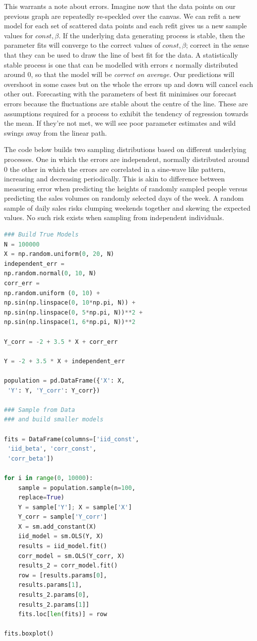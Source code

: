 \documentclass[10pt,a4paper,notitlepage, twocolumn]{article}
\begin{document}
This warrants a note about errors. Imagine now that the data points on our previous graph are repeatedly re-speckled over the canvas. We can refit a new model for each set of scattered data points and each refit gives us a new sample values for $ const, \beta$. If the underlying data generating process is stable, then the parameter fits will converge to the correct values of $const, \beta$; correct in the sense that they can be used to draw the line of best fit for the data. A statistically stable process is one that can be modelled with errors $\epsilon$ normally distributed around 0, so that the model will be \textit{ correct on average.} Our predictions will overshoot in some cases but on the whole the errors up and down will cancel each other out. Forecasting with the parameters of best fit minimises our forecast errors because the fluctuations are stable about the centre of the line. These are assumptions required for a process to exhibit the tendency of regression towards the mean. If they're not met, we will see poor parameter estimates and wild swings away from the linear path.
\newline

\noindent The code below builds two sampling distributions based on different underlying processes.  One in which the errors are independent, normally distributed around 0 the other in which the errors are correlated in a sine-wave like pattern, increasing and decreasing periodically. This is akin to difference between measuring error when predicting the heights of randomly sampled people versus predicting the sales volumes on randomly selected days of the week. A random sample of daily sales  risks clumping weekends together and skewing the expected values. No such risk exists when sampling from independent individuals. 

\begin{lstlisting}[language=Python]
### Build True Models
N = 100000
X = np.random.uniform(0, 20, N)
independent_err = 
np.random.normal(0, 10, N)
corr_err = 
np.random.uniform (0, 10) + 
np.sin(np.linspace(0, 10*np.pi, N)) + 
np.sin(np.linspace(0, 5*np.pi, N))**2 + 
np.sin(np.linspace(1, 6*np.pi, N))**2

Y_corr = -2 + 3.5 * X + corr_err

Y = -2 + 3.5 * X + independent_err

population = pd.DataFrame({'X': X,
 'Y': Y, 'Y_corr': Y_corr})

### Sample from Data 
### and build smaller models

fits = DataFrame(columns=['iid_const',
 'iid_beta', 'corr_const', 
 'corr_beta'])
 
for i in range(0, 10000):
    sample = population.sample(n=100, 
    replace=True)
    Y = sample['Y']; X = sample['X']
    Y_corr = sample['Y_corr']
    X = sm.add_constant(X)
    iid_model = sm.OLS(Y, X)
    results = iid_model.fit()
    corr_model = sm.OLS(Y_corr, X)
    results_2 = corr_model.fit()
    row = [results.params[0], 
    results.params[1],
    results_2.params[0], 
    results_2.params[1]]
    fits.loc[len(fits)] = row
    
fits.boxplot()
\end{lstlisting}
\end{document}
